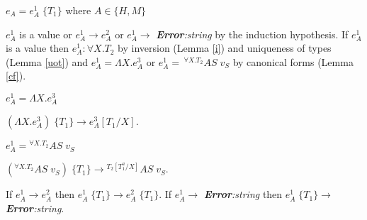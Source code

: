 \begin{case}
$e_{A}=e_{A}^{1}\;\lbrace T_{1}\rbrace$ where $A\in\lbrace H,M\rbrace$

$e_{A}^{1}$ is a value or $e_{A}^{1}\rightarrow e_{A}^{2}$ or $e_{A}^{1}\rightarrow$ \emph{\textbf{Error}:\;string} by the induction hypothesis.  If $e_{A}^{1}$ is a value then $e_{A}^{1}:\forall X.T_{2}$ by inversion (Lemma \ref{i}) and uniqueness of types (Lemma \ref{uot}) and $e_{A}^{1}=\Lambda X.e_{A}^{3}$ or $e_{A}^{1}=\,^{\forall X.T_{2}}AS\;v_{S}$ by canonical forms (Lemma \ref{cf}).
\begin{subcase}
$e_{A}^{1}=\Lambda X.e_{A}^{3}$

$(\Lambda X.e_{A}^{3})\;\lbrace T_{1}\rbrace\rightarrow e_{A}^{3}[T_{1}/X]$.
\end{subcase}
\begin{subcase}
$e_{A}^{1}={^{\forall X.T_{2}}A}S\;v_{S}$

$(^{\forall X.T_{2}}AS\;v_{S})\;\lbrace T_{1}\rbrace\rightarrow{^{T_{2}[T_{1}^{a}/X]}A}S\;v_{S}$.
\end{subcase}
If $e_{A}^{1}\rightarrow e_{A}^{2}$ then $e_{A}^{1}\;\lbrace T_{1}\rbrace\rightarrow e_{A}^{2}\;\lbrace T_{1}\rbrace$.  If $e_{A}^{1}\rightarrow$ \emph{\textbf{Error}:\;string} then $e_{A}^{1}\;\lbrace T_{1}\rbrace\rightarrow$ \emph{\textbf{Error}:\;string}.
\end{case}